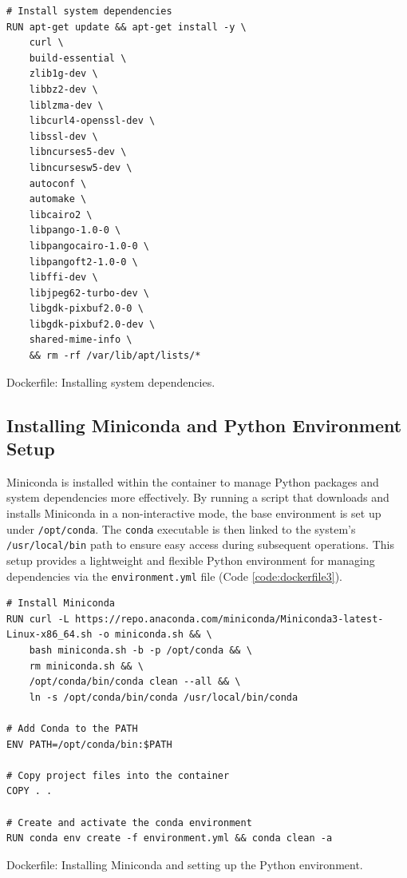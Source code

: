 \begin{longlisting}
\begin{verbatim}
# Install system dependencies
RUN apt-get update && apt-get install -y \
    curl \
    build-essential \
    zlib1g-dev \
    libbz2-dev \
    liblzma-dev \
    libcurl4-openssl-dev \
    libssl-dev \
    libncurses5-dev \
    libncursesw5-dev \
    autoconf \
    automake \
    libcairo2 \
    libpango-1.0-0 \
    libpangocairo-1.0-0 \
    libpangoft2-1.0-0 \
    libffi-dev \
    libjpeg62-turbo-dev \
    libgdk-pixbuf2.0-0 \
    libgdk-pixbuf2.0-dev \
    shared-mime-info \
    && rm -rf /var/lib/apt/lists/*
\end{verbatim}
\caption{Dockerfile: Installing system dependencies.}
\label{code:dockerfile2}
\end{longlisting}

\subsection{Installing Miniconda and Python Environment Setup}

Miniconda is installed within the container to manage Python packages and system dependencies more effectively. By running a script that downloads and installs Miniconda in a non-interactive mode, the base environment is set up under \texttt{/opt/conda}. The \texttt{conda} executable is then linked to the system's \texttt{/usr/local/bin} path to ensure easy access during subsequent operations. This setup provides a lightweight and flexible Python environment for managing dependencies via the \texttt{environment.yml} file (Code \ref{code:dockerfile3}).

\begin{longlisting}
\begin{verbatim}
# Install Miniconda
RUN curl -L https://repo.anaconda.com/miniconda/Miniconda3-latest-Linux-x86_64.sh -o miniconda.sh && \
    bash miniconda.sh -b -p /opt/conda && \
    rm miniconda.sh && \
    /opt/conda/bin/conda clean --all && \
    ln -s /opt/conda/bin/conda /usr/local/bin/conda

# Add Conda to the PATH
ENV PATH=/opt/conda/bin:$PATH

# Copy project files into the container
COPY . .

# Create and activate the conda environment
RUN conda env create -f environment.yml && conda clean -a
\end{verbatim}
\caption{Dockerfile: Installing Miniconda and setting up the Python environment.}
\label{code:dockerfile3}
\end{longlisting}

